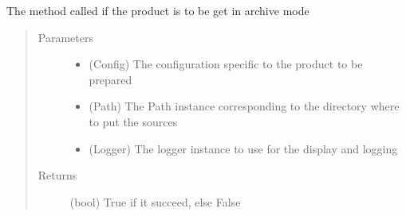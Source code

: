 \documentclass[a4paper,10pt,english]{sphinxmanual}
\begin{document}
\begin{fulllineitems}
\label{\detokenize{apidoc_commands/commands:commands.source.get_source_from_archive}}
The method called if the product is to be get in archive mode
\begin{quote}\begin{description}
\item[{Parameters}] \leavevmode\begin{itemize}
\item {} 
 \textendash{} (Config)
The configuration specific to 
the product to be prepared

\item {} 
 \textendash{} (Path)
The Path instance corresponding to the directory
where to put the sources

\item {} 
 \textendash{} (Logger) 
The logger instance to use for the display and logging

\end{itemize}

\item[{Returns}] \leavevmode
(bool) True if it succeed, else False

\end{description}\end{quote}

\end{fulllineitems}

\end{document}
